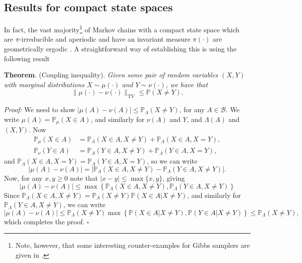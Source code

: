 \documentclass{article}
\newcommand{\B}{\mathcal{B}}
\newcommand{\TV}{\text{TV}}
\begin{document}
\subsection{Results for compact state spaces}
In fact, the vast majority\footnote{Note, however, that some interesting counter-examples for Gibbs samplers are given in \cite{roberts1998convergence}.} of Markov chains with a compact state space which are $\pi$-irreducible and aperiodic and have an invariant measure $\pi(\cdot)$ are geometrically ergodic \cite{meyn2009markov}.  A straightforward way of establishing this is using the following result

\textbf{Theorem}.  (Coupling inequality). {\itshape Given some pair of random variables $(X,Y)$ with marginal distributions $X \sim \mu(\cdot)$ and $Y \sim \nu(\cdot)$, we have that}
\begin{equation}
\|\mu(\cdot) - \nu(\cdot)\|_{\TV} \leq \mathbb{P}(X \neq Y).\label{eqn:coupling_inequality}
\end{equation}

\emph{Proof:} We need to show $|\mu(A) - \nu(A)| \leq \mathbb{P}_\Lambda(X \neq Y)$, for any $A \in \B$.  We write $\mu(A) = \mathbb{P}_\mu(X \in A)$, and similarly for $\nu(A)$ and $Y$, and $\Lambda(A)$ and $(X,Y)$.  Now
\begin{align*} \mathbb{P}_\mu(X \in A) &= \mathbb{P}_\Lambda(X \in A,X \neq Y) + \mathbb{P}_\Lambda(X \in A,X = Y), \\
\mathbb{P}_\nu(Y \in A) &= \mathbb{P}_\Lambda(Y \in A,X \neq Y) + \mathbb{P}_\Lambda(Y \in A,X = Y),
\end{align*}
and $\mathbb{P}_\Lambda(X \in A,X = Y) = \mathbb{P}_\Lambda(Y \in A,X = Y)$, so we can write
\[
|\mu(A) - \nu(A)| = \left|\mathbb{P}_\Lambda(X \in A,X \neq Y) - \mathbb{P}_\Lambda(Y \in A,X \neq Y)\right|.
\]
Now, for any $x,y \geq 0$ note that $|x-y| \leq \max\{x,y\}$, giving
\[
|\mu(A) - \nu(A)| \leq \max \left\{ \mathbb{P}_\Lambda(X \in A,X \neq Y), \mathbb{P}_\Lambda(Y \in A,X \neq Y) \right\}
\]
Since $\mathbb{P}_\Lambda(X \in A,X \neq Y) = \mathbb{P}_\Lambda(X \neq Y) \mathbb{P}(X \in A| X \neq Y)$, and similarly for $\mathbb{P}_\Lambda(Y \in A,X \neq Y)$, we can write
\[
|\mu(A) - \nu(A)| \leq \mathbb{P}_\Lambda(X \neq Y) \max \left\{ \mathbb{P}(X \in A | X \neq Y), \mathbb{P}(Y \in A |X \neq Y) \right\} \leq \mathbb{P}_\Lambda(X \neq Y),
\]
which completes the proof. \hfill $\square$
\end{document}
